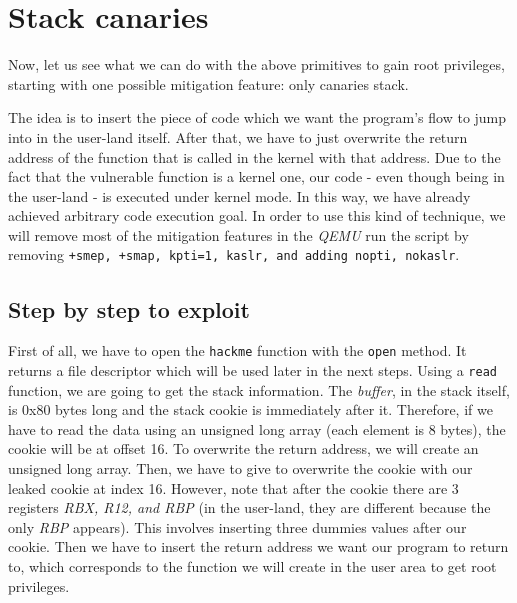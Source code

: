 \documentclass{masterthesis}
\begin{document}
\section{Stack canaries}
\label{sect:stackC}
Now, let us see what we can do with the above primitives to gain root privileges, starting with one possible mitigation feature: only canaries stack.

The idea is to insert the piece of code which we want the program’s flow to jump into in the user-land itself. After that, we have to just overwrite the return address of the function that is called in the kernel with that address. Due to the fact that the vulnerable function is a kernel one, our code - even though being in the user-land - is executed under kernel mode. In this way, we have already achieved arbitrary code execution goal.
In order to use this kind of technique, we will remove most of the mitigation features in the \emph{QEMU} run the script by removing \texttt{+smep, +smap, kpti=1, kaslr, and adding nopti, nokaslr}.
\subsection{Step by step to exploit}
First of all, we have to open the \texttt{hackme} function with the \texttt{open} method. It returns a file descriptor which will be used later in the next steps.
Using a \texttt{read} function, we are going to get the stack information.
The \emph{buffer}, in the stack itself, is 0x80 bytes long and the stack cookie is immediately after it. Therefore, if we have to read the data using an unsigned long array (each element is 8 bytes), the cookie will be at offset 16.
To overwrite the return address,  we will create an unsigned long array. Then, we have to give to overwrite the cookie with our leaked cookie at index 16. However, note that after the cookie there are 3 registers \textit{RBX, R12, and RBP} (in the user-land, they are different because the only \textit{RBP} appears).
This involves inserting three dummies values after our cookie. Then we have to insert the return address we want our program to return to, which corresponds to the function we will create in the user area to get root privileges.
\end{document}
